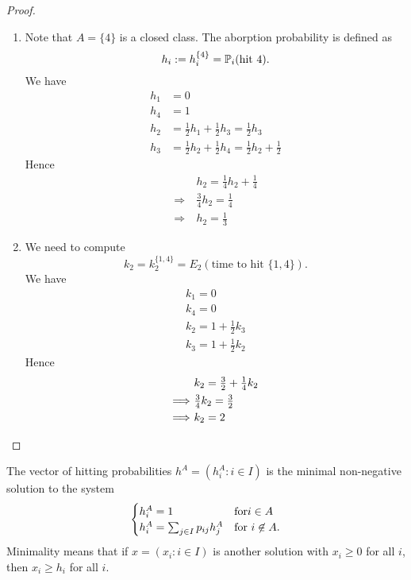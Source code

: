 \begin{proof}
\begin{enumerate}
  \item Note that \(A=\{4\}\) is a closed class. The aborption probability is defined as
\[
h_{i}:=h_{i}^{\{4\}}=\Bbb{P}_{i}(\text{hit } 4).
\]
We have
\begin{align*}
h_{1}&=0 \\
h_{4}&=1 \\
h_{2}&=\tfrac{1}{2}h_{1}+\tfrac{1}{2}h_{3} = \tfrac{1}{2}h_{3} \\
h_{3}&= \tfrac{1}{2}h_{2}+\tfrac{1}{2}h_{4}=\tfrac{1}{2}h_{2}+\tfrac{1}{2}
\end{align*}
Hence
\begin{align*}
&h_{2}=\tfrac{1}{4}h_{2}+\tfrac{1}{4} \\
\Longrightarrow \  &\tfrac{3}{4}h_{2} = \tfrac{1}{4} \\
\Longrightarrow \  &h_{2}=\tfrac{1}{3}
\end{align*}
  \item We need to compute
\[
k_{2}=k_{2}^{\{1,4\}}=E_{2}(\text{time to hit } \{1,4\}).
\]
We have
\begin{gather*}
k_{1}=0 \\
k_{4} = 0 \\
k_{2} = 1+\tfrac{1}{2}k_{3} \\
k_{3} = 1+ \tfrac{1}{2} k_{2}
\end{gather*}
Hence
\begin{align*}
&k_{2} = \tfrac{3}{2} + \tfrac{1}{4} k_{2} \\
\Longrightarrow \ \space &\tfrac{3}{4} k_{2}= \tfrac{3}{2} \\
\Longrightarrow \ \space &k_{2}=2
\end{align*}
\end{enumerate}
\end{proof}

\begin{thm}[Theorem 1.3.2]
The vector of hitting probabilities \(h^A=(h_{i}^A:i\in I)\) is the minimal non-negative solution to the system
\begin{align*}
\begin{cases}h_{i}^A=1 &\text{for}\space i\in A \\ h_{i}^A=\sum _{j\in I}p_{ij}h_{j}^A &\text{for }i\not\in A.\end{cases}
\end{align*}
Minimality means that if \(x=(x_{i}:i\in I)\) is another solution with \(x_{i}\geq 0\) for all \(i\), then \(x_{i}\geq h_{i}\) for all \(i\).
\end{thm}

